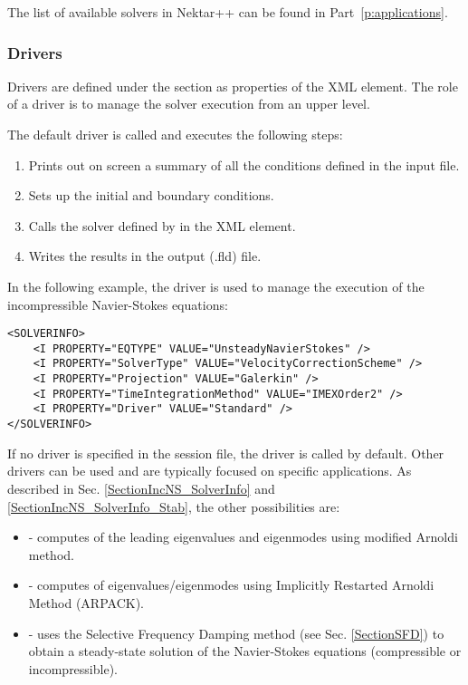 The list of available solvers in Nektar++ can be found in
Part~\ref{p:applications}.

\subsubsection{Drivers}
Drivers are defined under the  section as properties of the 
 XML element. The role of a driver is to manage the solver 
execution from an upper level. 

The default driver is called  and executes the following steps:
\begin{enumerate}
\item Prints out on screen a summary of all the conditions defined in the input file.
\item Sets up the initial and boundary conditions.
\item Calls the solver defined by   in the  XML element.
\item Writes the results in the output (.fld) file.
\end{enumerate}

In the following example, the driver  is used to manage the 
execution of the incompressible Navier-Stokes equations:
\begin{lstlisting}[style=XMLStyle]
<SOLVERINFO>
    <I PROPERTY="EQTYPE" VALUE="UnsteadyNavierStokes" />
    <I PROPERTY="SolverType" VALUE="VelocityCorrectionScheme" />
    <I PROPERTY="Projection" VALUE="Galerkin" />
    <I PROPERTY="TimeIntegrationMethod" VALUE="IMEXOrder2" />
    <I PROPERTY="Driver" VALUE="Standard" />
</SOLVERINFO>
\end{lstlisting}

If no driver is specified in the session file, the driver  is 
called by default. Other drivers can be used and are typically focused on
specific applications. As described in Sec.
\ref{SectionIncNS_SolverInfo} and  \ref{SectionIncNS_SolverInfo_Stab}, 
the other possibilities are:
\begin{itemize}
\item {}  - computes of the leading eigenvalues and 
eigenmodes using modified Arnoldi method.
\item {} - computes of eigenvalues/eigenmodes using Implicitly 
Restarted Arnoldi Method (ARPACK).
\item {} - uses the Selective Frequency Damping method 
(see Sec. \ref{SectionSFD}) to obtain a steady-state solution of the 
Navier-Stokes equations (compressible or incompressible).
\end{itemize}


